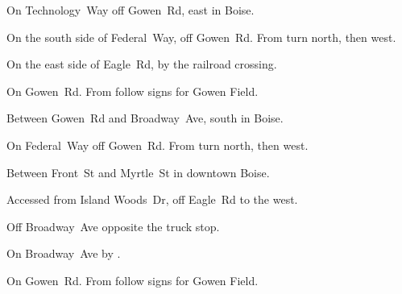 
\begin{LocationList}

On Technology~Way off  Gowen~Rd, east in Boise.

On the south side of Federal~Way, off  Gowen~Rd.
From   turn north, then west.

On the east side of  Eagle~Rd, by the railroad crossing.

\Location{\GarageHQ \Garage}
On Gowen~Rd. From   follow signs for Gowen Field.

Between Gowen~Rd and Broadway~Ave, south in Boise.

On Federal~Way off  Gowen~Rd.
From   turn north, then west.

Between  Front~St and  Myrtle~St in downtown Boise.

Accessed from Island Woods~Dr, off  Eagle~Rd to the west.

\Location{\RecruitmentAgency \Recruitment}
Off Broadway~Ave opposite the truck stop.

\Location{\TruckStop \Gas \Rest \Service \Weigh}
On Broadway~Ave by  .

On Gowen~Rd. From   follow signs for Gowen Field.

\end{LocationList}
